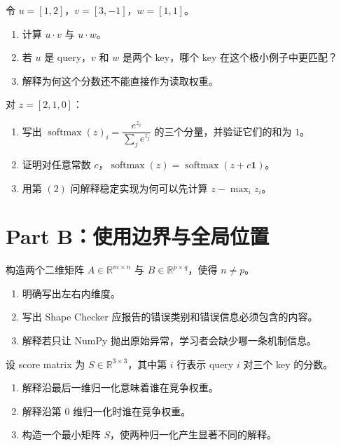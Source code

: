 \documentclass[11pt,a4paper]{article}
\begin{document}
令 $u = [1,2]$，$v = [3,-1]$，$w = [1,1]$。
\begin{enumerate}[label=(\arabic*)]
\item 计算 $u \cdot v$ 与 $u \cdot w$。
\item 若 $u$ 是 query，$v$ 和 $w$ 是两个 key，哪个 key 在这个极小例子中更匹配？
\item 解释为何这个分数还不能直接作为读取权重。
\end{enumerate}
\AnswerSpace{24mm}

对 $z=[2,1,0]$：
\begin{enumerate}[label=(\arabic*)]
\item 写出 $\operatorname{softmax}(z)_i = \dfrac{e^{z_i}}{\sum_j e^{z_j}}$ 的三个分量，并验证它们的和为 $1$。
\item 证明对任意常数 $c$，$\operatorname{softmax}(z)=\operatorname{softmax}(z+c\mathbf{1})$。
\item 用第 $(2)$ 问解释稳定实现为何可以先计算 $z-\max_i z_i$。
\end{enumerate}
\AnswerSpace{38mm}

\section{Part B：使用边界与全局位置}

构造两个二维矩阵 $A \in \mathbb{R}^{m \times n}$ 与 $B \in \mathbb{R}^{p \times q}$，使得 $n \ne p$。
\begin{enumerate}[label=(\arabic*)]
\item 明确写出左右内维度。
\item 写出 Shape Checker 应报告的错误类别和错误信息必须包含的内容。
\item 解释若只让 NumPy 抛出原始异常，学习者会缺少哪一条机制信息。
\end{enumerate}
\AnswerSpace{30mm}

设 score matrix 为 $S \in \mathbb{R}^{3 \times 3}$，其中第 $i$ 行表示 query $i$ 对三个 key 的分数。
\begin{enumerate}[label=(\arabic*)]
\item 解释沿最后一维归一化意味着谁在竞争权重。
\item 解释沿第 $0$ 维归一化时谁在竞争权重。
\item 构造一个最小矩阵 $S$，使两种归一化产生显著不同的解释。
\end{enumerate}
\AnswerSpace{30mm}
\end{document}
